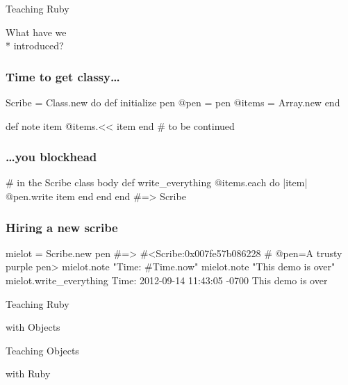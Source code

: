 \documentclass[20pt]{beamer}
\begin{document}
{
\begin{frame}
\par { Teaching Ruby}\par
\vspace{3cm}\hfill
{What have we\\* \hfill introduced?}
\end{frame}
}

\begin{frame}[fragile]
\frametitle{Time to get classy\ldots}
\begin{rubycode}
Scribe = Class.new do
  def initialize pen
    @pen = pen
    @items = Array.new
  end

  def note item
    @items.<< item
  end
  # to be continued
\end{rubycode}
\end{frame}

\begin{frame}[fragile]
\frametitle{\ldots{}you blockhead}
\begin{rubycode}
  # in the Scribe class body
  def write_everything
    @items.each do |item|
      @pen.write item
    end
  end
end
#=> Scribe
\end{rubycode}
\end{frame}

\begin{frame}[fragile]
\frametitle{Hiring a new scribe}
\begin{rubycode}
mielot = Scribe.new pen
#=> #<Scribe:0x007fe57b086228
#   @pen=A trusty purple pen>
mielot.note "Time: #{Time.now}"
mielot.note "This demo is over"
mielot.write_everything
Time: 2012-09-14 11:43:05 -0700
This demo is over
\end{rubycode}
\end{frame}

{
\begin{frame}
\par { Teaching Ruby}\par
\vspace{3cm}\hfill
{with Objects}
\end{frame}

\begin{frame}
\par { Teaching Objects}\par
\vspace{3cm}\hfill
{with Ruby}
\end{frame}
}
\end{document}
